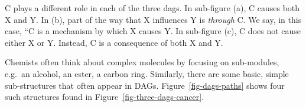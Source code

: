\documentclass[
  letterpaper,
  DIV=11,
  numbers=noendperiod,
  oneside]{scrartcl}
\begin{document}
{} C plays a different role in each of the
three dags. In sub-figure (a), C causes both X and Y. In (b), part of
the way that X influences Y is \emph{through} C. We say, in this case,
``C is a mechanism by which X causes Y. In sub-figure (c), C does not
cause either X or Y. Instead, C is a consequence of both X and Y.

Chemists often think about complex molecules by focusing on sub-modules,
e.g.~an alcohol, an ester, a carbon ring. Similarly, there are some
basic, simple sub-structures that often appear in DAGs.
Figure~\ref{fig-dags-paths} shows four such structures found in
Figure~\ref{fig-three-dags-cancer}.
\end{document}
